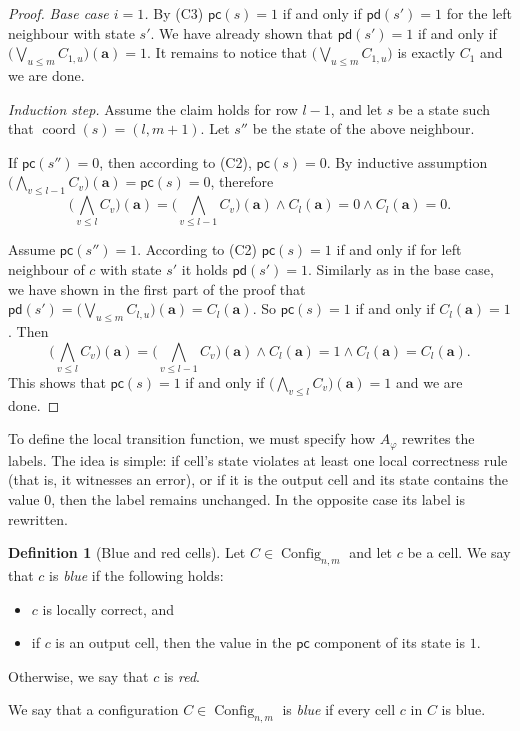 \documentclass{article}
\theoremstyle{plain}
\theoremstyle{definition}
\newtheorem{definition}[theorem]{Definition}
\DeclareMathOperator{\Config}{Config}
\DeclareMathOperator{\coord}{coord}
\newcommand{\pc}{\mathsf{pc}}
\newcommand{\tuple}{\mathbf}
\begin{document}
\begin{proof}
\emph{Base case $i=1$.}
By (C3) $\mathsf{pc}(s)=1$ if and only if $\mathsf{pd}(s')=1$ for the left neighbour with state $s'$. We have already shown that $\mathsf{pd}(s')=1$ if and only if $\bigl(\bigvee_{u \leq m} C_{1,u}\bigr)(\tuple a) = 1$. It remains to notice that $(\bigvee_{u \leq m} C_{1,u}\bigr)$ is exactly $C_1$ and we are done.


\emph{Induction step.}
Assume the claim holds for row $l-1$, and let $s$ be a state such that
$\coord(s)=(l,m+1)$. Let $s''$ be the state of the above neighbour.

If $\mathsf{pc}(s'')=0$, then according to (C2), $\mathsf{pc}(s)=0$. By inductive assumption $\bigl(\bigwedge_{v \leq l-1}C_v\bigr) (\tuple a) =\mathsf{pc}(s)=0$, therefore
\[
\bigl(\bigwedge_{v \leq l}C_v\bigr) (\tuple a) = \bigl(\bigwedge_{v \leq l-1}C_v\bigr) (\tuple a) \wedge C_{l}(\tuple a) = 0 \wedge C_{l}(\tuple a) =0.
\]

Assume $\mathsf{pc}(s'')=1$. According to (C2) $\mathsf{pc}(s)=1$ if and only if for left neighbour of $c$ with state $s'$ it holds $\mathsf{pd}(s')=1$. Similarly as in the base case, we have shown in the first part of the proof that $\mathsf{pd}(s') = (\bigvee_{u \leq m} C_{l,u}\bigr)(\tuple a) = C_{l}(\tuple a)$. So $\mathsf{pc}(s)=1$ if and only if $C_{l}(\tuple a) =1$. Then 
\[
\bigl(\bigwedge_{v \leq l}C_v\bigr) (\tuple a) = \bigl(\bigwedge_{v \leq l-1}C_v\bigr) (\tuple a) \wedge C_{l}(\tuple a) = 1 \wedge  C_{l}(\tuple a) = C_{l}(\tuple a).
\]
This shows that $\mathsf{pc}(s)=1$ if and only if $\bigl(\bigwedge_{v \leq l}C_v\bigr) (\tuple a) =1$ and we are done.
\end{proof}


To define the local transition function, we must specify how $A_\varphi$ rewrites
the labels.
The idea is simple: if cell's state violates at least one local correctness rule
(that is, it witnesses an error), or if it is the output cell and its state contains the
value $0$, then the label remains unchanged.
In the opposite case its label is rewritten.

\begin{definition}[Blue and red cells]\label{def:blue_red}
Let $C \in \Config_{n,m}$ and let $c$ be a cell.  
We say that $c$ is \emph{blue} if the following holds:
\begin{itemize}
    \item $c$ is locally correct, and
    \item if $c$ is an output cell, then the value in the $\pc$ component of its state is $1$.
\end{itemize}
Otherwise, we say that $c$ is \emph{red}.

We say that a configuration $C \in \Config_{n,m}$ is \emph{blue}
if every cell $c$ in $C$ is blue.
\end{definition}
\end{document}
